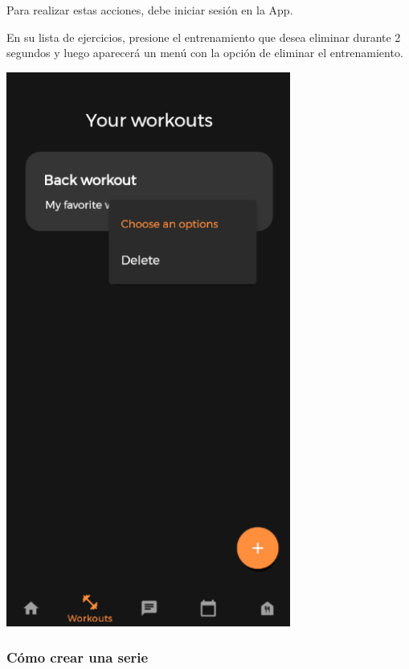 \documentclass[12pt,a4paper]{article}
\begin{document}
\begin{enumerate}
\item Para realizar estas acciones, debe iniciar sesión en la App.

\begin{minipage}{.60\textwidth}
  \item En su lista de ejercicios, presione el entrenamiento que desea eliminar durante 2 segundos y luego aparecerá un menú con la opción de eliminar el entrenamiento.
\end{minipage}
\begin{minipage}{.40\textwidth}
  \includegraphics[width=0.7\textwidth, right]{eliminarworkout}
\end{minipage}

\end{enumerate}


\clearpage

\subsubsection{Cómo crear una serie}
\end{document}
